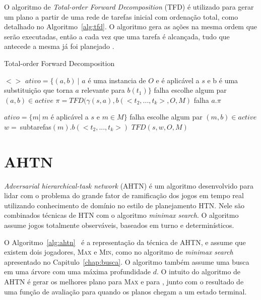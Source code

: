 O algoritmo de \textit{Total-order Forward Decomposition} (TFD) é utilizado para gerar um plano a partir de uma rede de tarefas inicial com ordenação total, como detalhado no Algoritmo~\ref{alg:tfd}.
O algoritmo gera as ações na mesma ordem que serão executadas, então a cada vez que uma tarefa é alcançada, tudo que antecede a mesma já foi planejado \cite{ghallab2004automated}.
 
\begin{algorithm}
	\caption{Total-order Forward Decomposition}
	\label{alg:tfd}
	\begin{algorithmic}[1]		
				\State	\Return $<>$
			\EndIf
				\State $ativo = \{(a, b)~ |$ $a$ é uma instancia de $O$ e é aplicável a $s$ e b é uma substituição que torna $a$ relevante para $b(t_{1})\}$
					\State \Return falha
				\EndIf
				\State escolhe algum par $(a, b) \in active$
				\State $\pi = TFD(\gamma(s, a), b(<t_{2}, ..., t_{k}>, O, M)$
					\State \Return falha
				\Else 
					\State \Return $a . \pi$
			\EndIf
			
				\State $ativo = \{m |~ m$ é aplicável a $s$ e $m \in M\}$
					\State \Return falha
				\EndIf
				\State escolhe algum par $(m, b) \in active$
				\State $w =~ $subtarefas$(m).b(<t_{2}, ..., t_{k}>)$
				\State \Return $TFD(s, w, O, M)$
				\EndIf
		\EndFunction
	\end{algorithmic}
\end{algorithm}

\section{AHTN} 

\textit{Adversarial hierarchical-task network} (AHTN) é um algoritmo desenvolvido para lidar com o problema do grande fator de ramificação dos jogos em tempo real~\cite{ontanon2015adversarial} utilizando conhecimento de domínio no estilo de planejamento HTN. 
Nele são combinados técnicas de HTN com o algoritmo \textit{minimax search}. 
O algoritmo assume jogos totalmente observáveis, baseados em turno e determinísticos. 

O Algoritmo~\ref{alg:ahtn}~\cite{ontanon2015adversarial} é a representação da técnica de AHTN, e assume que existem dois jogadores, \textsc{Max} e \textsc{Min}, como no algoritmo de \textit{minimax search} apresentado no Capitulo~\ref{chap:busca}.
O algoritmo também assume uma busca em uma árvore com uma máxima profundidade $d$. 
O intuito do algoritmo de AHTN é gerar os melhores plano para \textsc{Max} e para , junto com o resultado de uma função de avaliação para quando os planos chegam a um estado terminal. 

